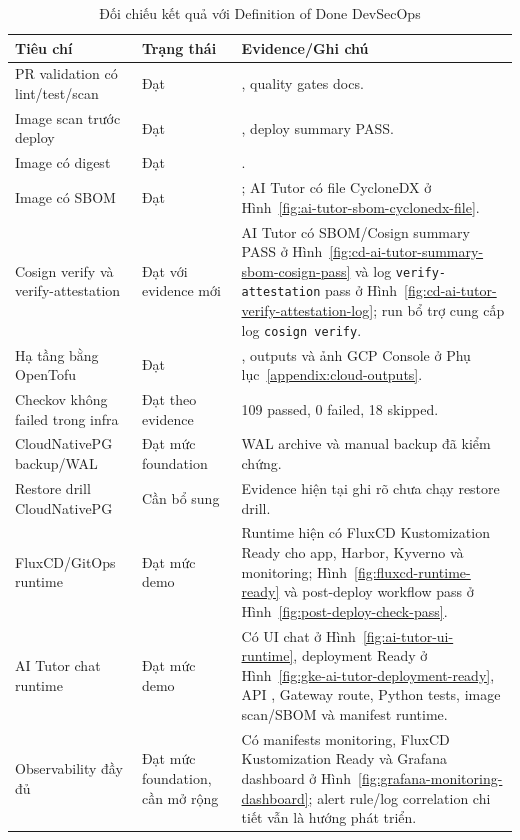 \begingroup
\small
{}
\renewcommand{\arraystretch}{1.05}
\begin{table}[H]
\centering
\caption{Đối chiếu kết quả với Definition of Done DevSecOps}
\label{tab:dod-evaluation}
\begin{tabularx}{\textwidth}{|p{}|p{}|Y|}
\hline
\textbf{Tiêu chí} & \textbf{Trạng thái} & \textbf{Evidence/Ghi chú} \\
\hline
PR validation có lint/test/scan & Đạt & , quality gates docs. \\
Image scan trước deploy & Đạt & , deploy summary PASS. \\
Image có digest & Đạt & . \\
Image có SBOM & Đạt & ; AI Tutor có file CycloneDX ở Hình~\ref{fig:ai-tutor-sbom-cyclonedx-file}. \\
Cosign verify và verify-attestation & Đạt với evidence mới & AI Tutor có SBOM/Cosign summary PASS ở Hình~\ref{fig:cd-ai-tutor-summary-sbom-cosign-pass} và log \texttt{verify-attestation} pass ở Hình~\ref{fig:cd-ai-tutor-verify-attestation-log}; run bổ trợ cung cấp log \texttt{cosign verify}. \\
Hạ tầng bằng OpenTofu & Đạt & , outputs và ảnh GCP Console ở Phụ lục~\ref{appendix:cloud-outputs}. \\
Checkov không failed trong infra & Đạt theo evidence & 109 passed, 0 failed, 18 skipped. \\
CloudNativePG backup/WAL & Đạt mức foundation & WAL archive và manual backup đã kiểm chứng. \\
Restore drill CloudNativePG & Cần bổ sung & Evidence hiện tại ghi rõ chưa chạy restore drill. \\
FluxCD/GitOps runtime & Đạt mức demo & Runtime hiện có FluxCD Kustomization Ready cho app, Harbor, Kyverno và monitoring; Hình~\ref{fig:fluxcd-runtime-ready} và post-deploy workflow pass ở Hình~\ref{fig:post-deploy-check-pass}. \\
AI Tutor chat runtime & Đạt mức demo & Có UI chat ở Hình~\ref{fig:ai-tutor-ui-runtime}, deployment Ready ở Hình~\ref{fig:gke-ai-tutor-deployment-ready}, API , Gateway route, Python tests, image scan/SBOM và manifest runtime. \\
Observability đầy đủ & Đạt mức foundation, cần mở rộng & Có manifests monitoring, FluxCD Kustomization Ready và Grafana dashboard ở Hình~\ref{fig:grafana-monitoring-dashboard}; alert rule/log correlation chi tiết vẫn là hướng phát triển. \\
\hline
\end{tabularx}
\end{table}
\endgroup
